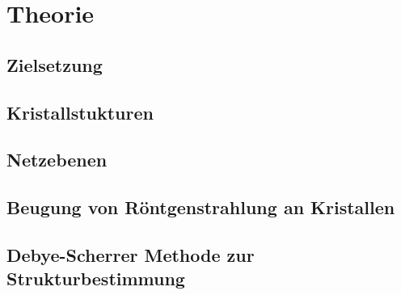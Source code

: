 \section{Theorie}
\label{sec:Theorie}

\subsection{Zielsetzung}
\label{subsec:zielsetzung}


\subsection{Kristallstukturen}
\label{subsec:kristallstruktur}


\subsection{Netzebenen}
\label{subsec:Netzebenen}

\subsection{Beugung von Röntgenstrahlung an Kristallen}
\label{subsec:BeugungKristall}



\subsection{Debye-Scherrer Methode zur Strukturbestimmung}
\label{Strukturbestimmung}
\cite{sample}
